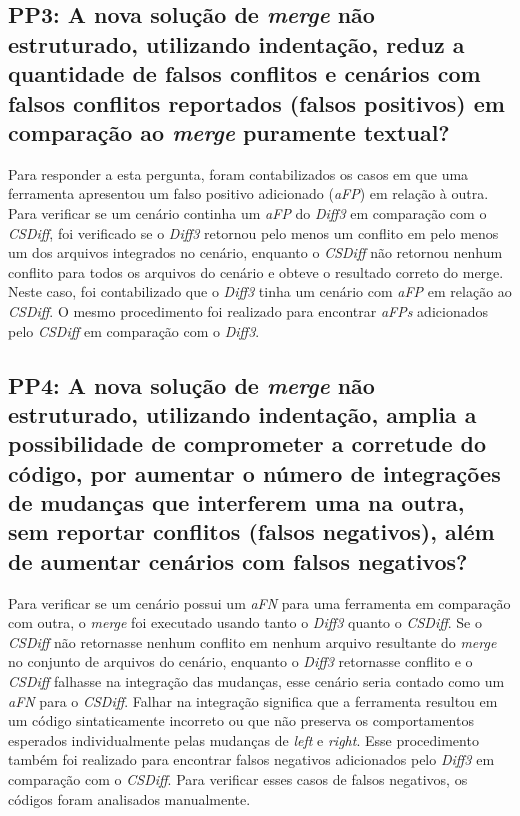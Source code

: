 \subsection{PP3: A nova solução de \emph{merge} não estruturado, utilizando indentação,
	reduz a quantidade de falsos conflitos e cenários com falsos conflitos reportados
	(falsos positivos) em comparação ao \emph{merge} puramente textual?}
Para responder a esta pergunta, foram contabilizados os casos em que uma
ferramenta apresentou um falso positivo adicionado (\emph{aFP}) em relação à outra.
Para verificar se um cenário continha um \emph{aFP} do \emph{Diff3} em comparação com o \emph{CSDiff},
foi verificado se o \emph{Diff3} retornou pelo menos um conflito em pelo menos um dos arquivos integrados no cenário,
enquanto o \emph{CSDiff} não retornou nenhum conflito para todos os arquivos do cenário e obteve o resultado correto do merge.
Neste caso, foi contabilizado que o \emph{Diff3} tinha um cenário com \emph{aFP} em relação ao \emph{CSDiff}.
O mesmo procedimento foi realizado para encontrar \emph{aFPs} adicionados pelo \emph{CSDiff} em comparação com o \emph{Diff3}.
\subsection{PP4: A nova solução de \emph{merge} não estruturado, utilizando indentação,
	amplia a possibilidade de comprometer a corretude do código, por aumentar o número de
	integrações de mudanças que interferem uma na outra, sem reportar conflitos (falsos negativos),
	além de aumentar cenários com falsos negativos?}
Para verificar se um cenário possui um \emph{aFN} para uma ferramenta em comparação com outra,
o \emph{merge} foi executado usando tanto o \emph{Diff3} quanto o \emph{CSDiff}. Se o \emph{CSDiff} não retornasse nenhum
conflito em nenhum arquivo resultante do \emph{merge} no conjunto de arquivos do cenário, enquanto o
\emph{Diff3} retornasse conflito e o \emph{CSDiff} falhasse na integração das mudanças, esse cenário seria
contado como um \emph{aFN} para o \emph{CSDiff}. Falhar na integração significa que a ferramenta resultou em um
código sintaticamente incorreto ou que não preserva os comportamentos esperados individualmente pelas
mudanças de \emph{left} e \emph{right}. Esse procedimento também foi realizado para encontrar falsos negativos
adicionados pelo \emph{Diff3} em comparação com o \emph{CSDiff}. Para verificar esses casos de falsos negativos,
os códigos foram analisados manualmente.
